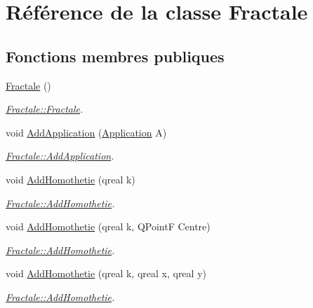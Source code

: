 \hypertarget{class_fractale}{}\section{Référence de la classe Fractale}
\label{class_fractale}
\subsection*{Fonctions membres publiques}
\begin{DoxyCompactItemize}
\item 
\hypertarget{class_fractale_a0d3df9f1e22b8e83271406a5cf1d4f93}{}\hyperlink{class_fractale_a0d3df9f1e22b8e83271406a5cf1d4f93}{Fractale} ()\label{class_fractale_a0d3df9f1e22b8e83271406a5cf1d4f93}

\begin{DoxyCompactList}\small\item\em \hyperlink{class_fractale_a0d3df9f1e22b8e83271406a5cf1d4f93}{Fractale\+::\+Fractale}. \end{DoxyCompactList}\item 
void \hyperlink{class_fractale_a395f48f89bd58d7eb5bee40eb9ebb23e}{Add\+Application} (\hyperlink{class_application}{Application} A)
\begin{DoxyCompactList}\small\item\em \hyperlink{class_fractale_a395f48f89bd58d7eb5bee40eb9ebb23e}{Fractale\+::\+Add\+Application}. \end{DoxyCompactList}\item 
void \hyperlink{class_fractale_a41004fff17f45f2ad3fb6c8ae15f0697}{Add\+Homothetie} (qreal k)
\begin{DoxyCompactList}\small\item\em \hyperlink{class_fractale_a41004fff17f45f2ad3fb6c8ae15f0697}{Fractale\+::\+Add\+Homothetie}. \end{DoxyCompactList}\item 
void \hyperlink{class_fractale_a4f66b9d2056c70cbec0904750cc0efbd}{Add\+Homothetie} (qreal k, Q\+Point\+F Centre)
\begin{DoxyCompactList}\small\item\em \hyperlink{class_fractale_a41004fff17f45f2ad3fb6c8ae15f0697}{Fractale\+::\+Add\+Homothetie}. \end{DoxyCompactList}\item 
void \hyperlink{class_fractale_ae8645aad7d5a2191fcef0354edf45991}{Add\+Homothetie} (qreal k, qreal x, qreal y)
\begin{DoxyCompactList}\small\item\em \hyperlink{class_fractale_a41004fff17f45f2ad3fb6c8ae15f0697}{Fractale\+::\+Add\+Homothetie}. \end{DoxyCompactList}\item 

\end{DoxyCompactItemize}
